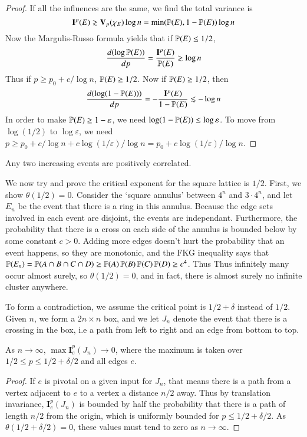 \begin{proof}
    If all the influences are the same, we find the total variance is
    \[ \mathbf{I}^p(E) \gtrsim \mathbf{V}_p(\chi_E) \log n = \min (\operatorname{\mathbb{P}}(E), 1 - \operatorname{\mathbb{P}}(E)) \log n \]
    Now the Margulis-Russo formula yields that if $\operatorname{\mathbb{P}}(E) \leq 1/2$,
    \[ \frac{d(\log \operatorname{\mathbb{P}}(E))}{dp} = \frac{\mathbf{I}^p(E)}{\operatorname{\mathbb{P}}(E)} \gtrsim \log n \]
    Thus if $p \geq p_0 + c/\log n$, $\operatorname{\mathbb{P}}(E) \geq 1/2$. Now if $\operatorname{\mathbb{P}}(E) \geq 1/2$, then
    \[ \frac{d(\log(1 - \operatorname{\mathbb{P}}(E)))}{dp} = - \frac{\mathbf{I}^p(E)}{1 - \operatorname{\mathbb{P}}(E)} \lesssim - \log n \]
    In order to make $\operatorname{\mathbb{P}}(E) \geq 1-\varepsilon$, we need $\log(1 - \operatorname{\mathbb{P}}(E)) \leq \log \varepsilon$. To move from $\log(1/2)$ to $\log \varepsilon$, we need $p \geq p_0 + c/\log n + c \log(1/\varepsilon)/\log n = p_0 + c \log(1/\varepsilon)/\log n$.
\end{proof}

\begin{theorem}[FKG]
    Any two increasing events are positively correlated.
\end{theorem}

We now try and prove the critical exponent for the square lattice is $1/2$. First, we show $\theta(1/2) = 0$. Consider the `square annulus' between $4^n$ and $3 \cdot 4^n$, and let $E_n$ be the event that there is a ring in this annulus. Because the edge sets involved in each event are disjoint, the events are independant. Furthermore, the probability that there is a cross on each side of the annulus is bounded below by some constant $c > 0$. Adding more edges doesn't hurt the probability that an event happens, so they are monotonic, and the FKG inequality says that $\operatorname{\mathbb{P}}(E_n) = \operatorname{\mathbb{P}}(A \cap B \cap C \cap D) \geq \operatorname{\mathbb{P}}(A) \operatorname{\mathbb{P}}(B) \operatorname{\mathbb{P}}(C) \operatorname{\mathbb{P}}(D) \geq c^4$. Thus Thus infinitely many occur almost surely, so $\theta(1/2) = 0$, and in fact, there is almost surely no infinite cluster anywhere.

To form a contradiction, we assume the critical point is $1/2 + \delta$ instead of $1/2$. Given $n$, we form a $2n \times n$ box, and we let $J_n$ denote the event that there is a crossing in the box, i.e a path from left to right and an edge from bottom to top.

\begin{lemma}
    As $n \to \infty$, $\max \mathbf{I}_e^{p}(J_n) \to 0$, where the maximum is taken over $1/2 \leq p \leq 1/2 + \delta/2$ and all edges $e$.
\end{lemma}
\begin{proof}
    If $e$ is pivotal on a given input for $J_n$, that means there is a path from a vertex adjacent to $e$ to a vertex a distance $n/2$ away. Thus by translation invariance, $\mathbf{I}_e^p(J_n)$ is bounded by half the probability that there is a path of length $n/2$ from the origin, which is uniformly bounded for $p \leq 1/2 + \delta/2$. As $\theta(1/2 + \delta/2) = 0$, these values must tend to zero as $n \to \infty$.
\end{proof}

